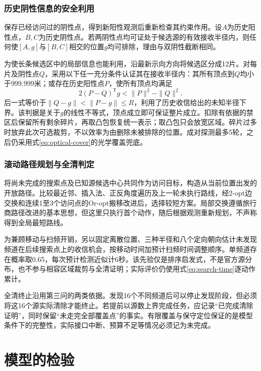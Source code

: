 \documentclass{JXUSTmodeling}
\begin{document}
\subsubsection{历史阴性信息的安全利用}
保存已经访问过的阴性点，得到新阳性观测后重新检查其约束作用。设$A$为历史阳性点，$B,C$为历史阴性点。若两阴性点均可证处于候选源的有效接收半径内，则任何使$[A,g]$与$[B,C]$相交的位置$g$均可排除，理由与双阴性截断相同。

为使长条候选区中的局部信息也能利用，沿最新示向方向将候选区分成12片。对每片及阴性点$Q$，采用以下任一充分条件认证其在接收半径内：其所有顶点到$Q$均小于999.999米；或存在历史阳性点$P$，使所有顶点均满足
\begin{equation}
 2(P-Q)^{\mathsf T}g<\|P\|^2-\|Q\|^2.
 \label{eq:relative-reception}
\end{equation}
后一式等价于$\|Q-g\|<\|P-g\|\le R$，利用了历史收信给出的未知半径下界。该判据是关于$g$的线性不等式，顶点成立即可保证整片成立。扣除有依据的禁区后保留所有剩余碎片，再取凸包恢复统一表示；取凸包只会放宽区域。碎片过多时放弃此次可选裁剪，不以效率为由删除未被排除的位置。成对探测最多5轮，之后仍采用式\eqref{eq:optical-cover}的光学覆盖兜底。

\subsubsection{滚动路径规划与全清判定}
将尚未完成的搜索点及已知源候选中心共同作为访问目标，构造从当前位置出发的开放路径。比较最近邻、插入法、正反角度遍历及上一轮未执行路线，经2-opt边交换和连续1至3个访问点的Or-opt搬移改进后，选择较短方案。局部交换遵循旅行商路径改进的基本思想\cite{croes1958}，但这里只执行首个动作，随后根据观测重新规划，不声称得到全局最短路线。

为兼顾移动与扫频开销，另以固定离散位置、三种半径和八个定向朝向估计未发现频道在后续搜索点上的收信机会，按移动时间加预计扫频时间调整顺序。单频道存在概率取0.65，每次预计检测近似计6秒。该先验仅是排序启发式，不是官方源分布，也不参与相容区域裁剪与全清证明；实际评价仍使用式\eqref{eq:search-time}逐动作累计。

全清终止沿用第三问的两类依据。发现16个不同频道后可以停止发现阶段，但必须将这16个源实际清除才能终止。若提前以源数上界完成任务，应记录“已完成清除证明”，同时保留“未走完全部覆盖点”的事实。有限覆盖与保守定位保证的是模型条件下的完整性，实际接口中断、预算不足等情况必须记为未完成。


\section{模型的检验}\label{sec:6}
\end{document}

